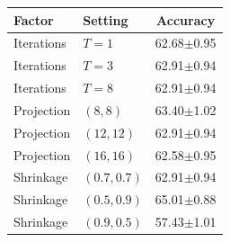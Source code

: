\begin{tabular}{llc}
\toprule
Factor & Setting & Accuracy \\
\midrule
Iterations & $T=1$ & 62.68$\pm$0.95 \\
Iterations & $T=3$ & 62.91$\pm$0.94 \\
Iterations & $T=8$ & 62.91$\pm$0.94 \\
Projection & $(8,8)$ & 63.40$\pm$1.02 \\
Projection & $(12,12)$ & 62.91$\pm$0.94 \\
Projection & $(16,16)$ & 62.58$\pm$0.95 \\
Shrinkage & $(0.7,0.7)$ & 62.91$\pm$0.94 \\
Shrinkage & $(0.5,0.9)$ & 65.01$\pm$0.88 \\
Shrinkage & $(0.9,0.5)$ & 57.43$\pm$1.01 \\
\bottomrule
\end{tabular}
